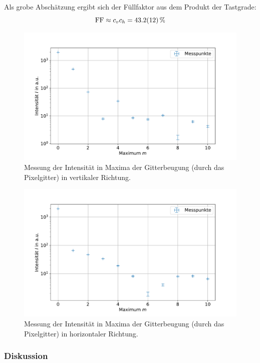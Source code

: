 \documentclass[
	a4paper,
	12pt,
	pagesize,
	ngerman
]{scrartcl}
\begin{document}
		Als grobe Abschätzung ergibt sich der Füllfaktor aus dem Produkt der Tastgrade:
		\begin{equation}
			\text{FF} \approx c_v c_h =\SI{43.2+-1.2}{\percent}
		\end{equation}


\begin{figure}[H]
			\includegraphics[width=0.8\linewidth]{img/sinc1}
			\caption{
			Messung der Intensität in Maxima der Gitterbeugung (durch das Pixelgitter) in vertikaler Richtung.
			}
			\label{fig_sinc1}
	\end{figure}

\begin{figure}[H] %
			\includegraphics[width=0.8\linewidth]{img/sinc2}
			\caption{
			Messung der Intensität in Maxima der Gitterbeugung (durch das Pixelgitter) in horizontaler Richtung.
			}
			\label{fig_sinc2}
	\end{figure}


			\subsubsection*{Diskussion}
\end{document}
